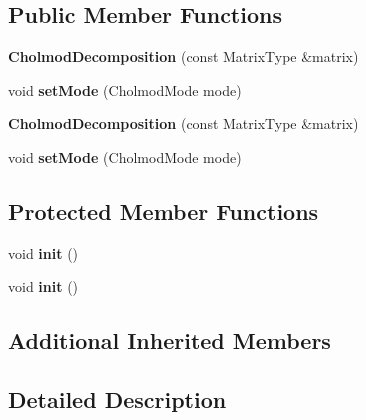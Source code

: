 \subsection*{Public Member Functions}
\begin{DoxyCompactItemize}
\item 
\mbox{\label{class_eigen_1_1_cholmod_decomposition_aa89a5c32285a145485f143caa234cd9d}} 
{\bfseries Cholmod\+Decomposition} (const Matrix\+Type \&matrix)
\item 
\mbox{\label{class_eigen_1_1_cholmod_decomposition_afa7d632441f66874d4097276d5e23df5}} 
void {\bfseries set\+Mode} (Cholmod\+Mode mode)
\item 
\mbox{\label{class_eigen_1_1_cholmod_decomposition_aa89a5c32285a145485f143caa234cd9d}} 
{\bfseries Cholmod\+Decomposition} (const Matrix\+Type \&matrix)
\item 
\mbox{\label{class_eigen_1_1_cholmod_decomposition_afa7d632441f66874d4097276d5e23df5}} 
void {\bfseries set\+Mode} (Cholmod\+Mode mode)
\end{DoxyCompactItemize}
\subsection*{Protected Member Functions}
\begin{DoxyCompactItemize}
\item 
\mbox{\label{class_eigen_1_1_cholmod_decomposition_a85db020782a18263b54252eb7b4ba15f}} 
void {\bfseries init} ()
\item 
\mbox{\label{class_eigen_1_1_cholmod_decomposition_a85db020782a18263b54252eb7b4ba15f}} 
void {\bfseries init} ()
\end{DoxyCompactItemize}
\subsection*{Additional Inherited Members}


\subsection{Detailed Description}

